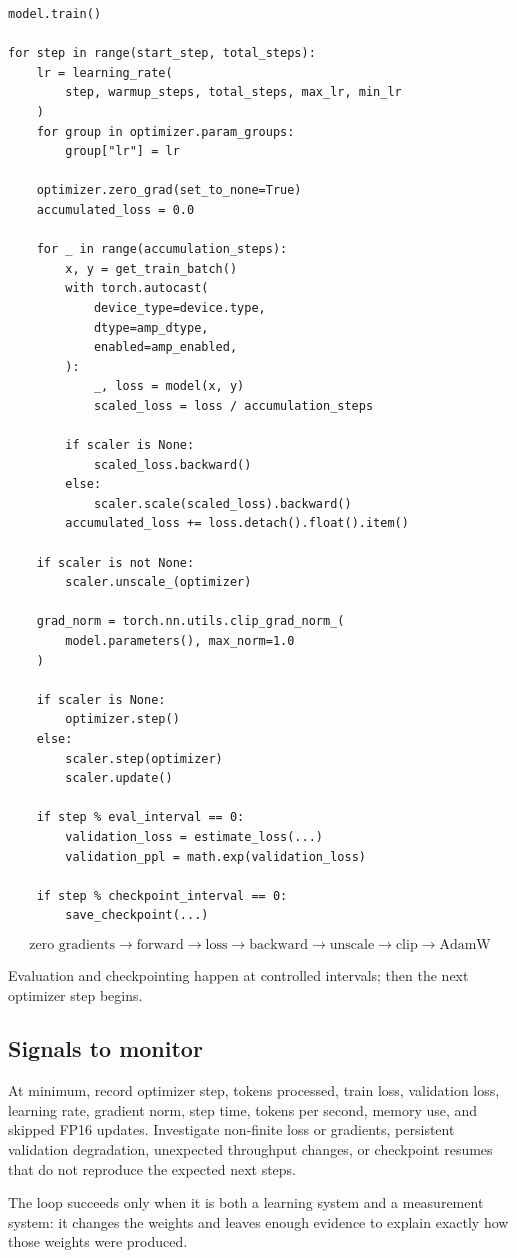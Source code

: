 \begin{lstlisting}[style=shadedpython]
model.train()

for step in range(start_step, total_steps):
    lr = learning_rate(
        step, warmup_steps, total_steps, max_lr, min_lr
    )
    for group in optimizer.param_groups:
        group["lr"] = lr

    optimizer.zero_grad(set_to_none=True)
    accumulated_loss = 0.0

    for _ in range(accumulation_steps):
        x, y = get_train_batch()
        with torch.autocast(
            device_type=device.type,
            dtype=amp_dtype,
            enabled=amp_enabled,
        ):
            _, loss = model(x, y)
            scaled_loss = loss / accumulation_steps

        if scaler is None:
            scaled_loss.backward()
        else:
            scaler.scale(scaled_loss).backward()
        accumulated_loss += loss.detach().float().item()

    if scaler is not None:
        scaler.unscale_(optimizer)

    grad_norm = torch.nn.utils.clip_grad_norm_(
        model.parameters(), max_norm=1.0
    )

    if scaler is None:
        optimizer.step()
    else:
        scaler.step(optimizer)
        scaler.update()

    if step % eval_interval == 0:
        validation_loss = estimate_loss(...)
        validation_ppl = math.exp(validation_loss)

    if step % checkpoint_interval == 0:
        save_checkpoint(...)
\end{lstlisting}

\[
  \boxed{
  \text{zero gradients}
  \rightarrow\text{forward}
  \rightarrow\text{loss}
  \rightarrow\text{backward}
  \rightarrow\text{unscale}
  \rightarrow\text{clip}
  \rightarrow\text{AdamW}
  }
\]

Evaluation and checkpointing happen at controlled intervals; then the next
optimizer step begins.

\subsection{Signals to monitor}

At minimum, record optimizer step, tokens processed, train loss, validation
loss, learning rate, gradient norm, step time, tokens per second, memory use,
and skipped FP16 updates. Investigate non-finite loss or gradients, persistent
validation degradation, unexpected throughput changes, or checkpoint resumes
that do not reproduce the expected next steps.

The loop succeeds only when it is both a learning system and a measurement
system: it changes the weights and leaves enough evidence to explain exactly
how those weights were produced.
